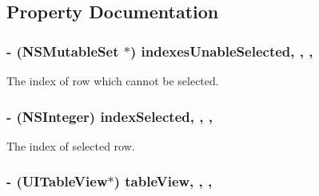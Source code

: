 \subsection{Property Documentation}
\hypertarget{interface_title_table_view_controller_a97663dd3b86d043d6371a80216ecaf1d}{
\subsubsection[{indexes\+Unable\+Selected}]{\setlength{\rightskip}{0pt plus 5cm}-\/ (N\+S\+Mutable\+Set $\ast$) indexes\+Unable\+Selected\hspace{0.3cm}{\ttfamily [read]}, {\ttfamily [write]}, {\ttfamily [nonatomic]}, {\ttfamily [assign]}}}\label{interface_title_table_view_controller_a97663dd3b86d043d6371a80216ecaf1d}
The index of row which cannot be selected. \hypertarget{interface_title_table_view_controller_a836ce3317d51d9812f9407611df8327e}{
\subsubsection[{index\+Selected}]{\setlength{\rightskip}{0pt plus 5cm}-\/ (N\+S\+Integer) index\+Selected\hspace{0.3cm}{\ttfamily [read]}, {\ttfamily [write]}, {\ttfamily [nonatomic]}, {\ttfamily [assign]}}}\label{interface_title_table_view_controller_a836ce3317d51d9812f9407611df8327e}
The index of selected row. \hypertarget{interface_title_table_view_controller_a28fd55d5b91428c42c821986765afc79}{
\subsubsection[{table\+View}]{\setlength{\rightskip}{0pt plus 5cm}-\/ (U\+I\+Table\+View$\ast$) table\+View\hspace{0.3cm}{\ttfamily [read]}, {\ttfamily [write]}, {\ttfamily [nonatomic]}, {\ttfamily [weak]}}}\label{interface_title_table_view_controller_a28fd55d5b91428c42c821986765afc79}
